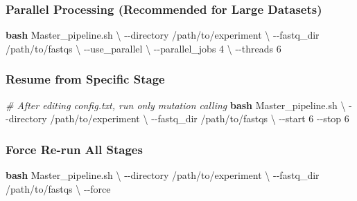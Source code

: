 \documentclass[
]{article}
\newenvironment{Shaded}{\begin{snugshade}}{\end{snugshade}}
\newcommand{\AttributeTok}[1]{\textcolor[rgb]{0.13,0.29,0.53}{#1}}
\newcommand{\CommentTok}[1]{\textcolor[rgb]{0.56,0.35,0.01}{\textit{#1}}}
\newcommand{\DataTypeTok}[1]{\textcolor[rgb]{0.13,0.29,0.53}{#1}}
\newcommand{\FunctionTok}[1]{\textcolor[rgb]{0.13,0.29,0.53}{\textbf{#1}}}
\newcommand{\NormalTok}[1]{#1}
\begin{document}
\subsubsection{Parallel Processing (Recommended for Large
Datasets)}\label{parallel-processing-recommended-for-large-datasets}

\begin{Shaded}
\begin{Highlighting}[]
\FunctionTok{bash}\NormalTok{ Master\_pipeline.sh }\DataTypeTok{\textbackslash{}}
  \AttributeTok{{-}{-}directory}\NormalTok{ /path/to/experiment }\DataTypeTok{\textbackslash{}}
  \AttributeTok{{-}{-}fastq\_dir}\NormalTok{ /path/to/fastqs }\DataTypeTok{\textbackslash{}}
  \AttributeTok{{-}{-}use\_parallel} \DataTypeTok{\textbackslash{}}
  \AttributeTok{{-}{-}parallel\_jobs}\NormalTok{ 4 }\DataTypeTok{\textbackslash{}}
  \AttributeTok{{-}{-}threads}\NormalTok{ 6}
\end{Highlighting}
\end{Shaded}

\subsubsection{Resume from Specific
Stage}\label{resume-from-specific-stage}

\begin{Shaded}
\begin{Highlighting}[]
\CommentTok{\# After editing config.txt, run only mutation calling}
\FunctionTok{bash}\NormalTok{ Master\_pipeline.sh }\DataTypeTok{\textbackslash{}}
  \AttributeTok{{-}{-}directory}\NormalTok{ /path/to/experiment }\DataTypeTok{\textbackslash{}}
  \AttributeTok{{-}{-}fastq\_dir}\NormalTok{ /path/to/fastqs }\DataTypeTok{\textbackslash{}}
  \AttributeTok{{-}{-}start}\NormalTok{ 6 }\AttributeTok{{-}{-}stop}\NormalTok{ 6}
\end{Highlighting}
\end{Shaded}

\subsubsection{Force Re-run All Stages}\label{force-re-run-all-stages}

\begin{Shaded}
\begin{Highlighting}[]
\FunctionTok{bash}\NormalTok{ Master\_pipeline.sh }\DataTypeTok{\textbackslash{}}
  \AttributeTok{{-}{-}directory}\NormalTok{ /path/to/experiment }\DataTypeTok{\textbackslash{}}
  \AttributeTok{{-}{-}fastq\_dir}\NormalTok{ /path/to/fastqs }\DataTypeTok{\textbackslash{}}
  \AttributeTok{{-}{-}force}
\end{Highlighting}
\end{Shaded}
\end{document}
